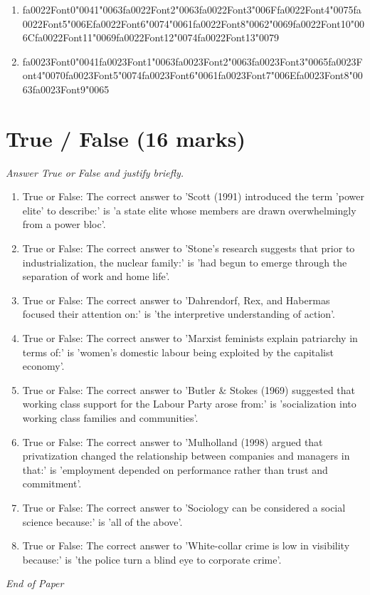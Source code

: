 \documentclass[12pt]{article}
\begin{document}
\begin{enumerate}[label=\arabic*.]
\begin{enumerate}[label=(\alph*)]
    \item {\csname fa0022Font0\endcsname\char"0041}{\char"0063}{\csname fa0022Font2\endcsname\char"0063}{\csname fa0022Font3\endcsname\char"006F}{\csname fa0022Font4\endcsname\char"0075}{\csname fa0022Font5\endcsname\char"006E}{\csname fa0022Font6\endcsname\char"0074}{\char"0061}{\csname fa0022Font8\endcsname\char"0062}{\char"0069}{\csname fa0022Font10\endcsname\char"006C}{\csname fa0022Font11\endcsname\char"0069}{\csname fa0022Font12\endcsname\char"0074}{\csname fa0022Font13\endcsname\char"0079}
    \item {\csname fa0023Font0\endcsname\char"0041}{\csname fa0023Font1\endcsname\char"0063}{\csname fa0023Font2\endcsname\char"0063}{\csname fa0023Font3\endcsname\char"0065}{\csname fa0023Font4\endcsname\char"0070}{\csname fa0023Font5\endcsname\char"0074}{\csname fa0023Font6\endcsname\char"0061}{\csname fa0023Font7\endcsname\char"006E}{\csname fa0023Font8\endcsname\char"0063}{\csname fa0023Font9\endcsname\char"0065}
\end{enumerate}
\end{enumerate}

\section*{True / False (16 marks)}
\textit{Answer True or False and justify briefly.}
\begin{enumerate}[label=\arabic*.]
\item True or False: The correct answer to 'Scott (1991) introduced the term 'power elite' to describe:' is 'a state elite whose members are drawn overwhelmingly from a power bloc'.
\item True or False: The correct answer to 'Stone's research suggests that prior to industrialization, the nuclear family:' is 'had begun to emerge through the separation of work and home life'.
\item True or False: The correct answer to 'Dahrendorf, Rex, and Habermas focused their attention on:' is 'the interpretive understanding of action'.
\item True or False: The correct answer to 'Marxist feminists explain patriarchy in terms of:' is 'women's domestic labour being exploited by the capitalist economy'.
\item True or False: The correct answer to 'Butler \& Stokes (1969) suggested that working class support for the Labour Party arose from:' is 'socialization into working class families and communities'.
\item True or False: The correct answer to 'Mulholland (1998) argued that privatization changed the relationship between companies and managers in that:' is 'employment depended on performance rather than trust and commitment'.
\item True or False: The correct answer to 'Sociology can be considered a social science because:' is 'all of the above'.
\item True or False: The correct answer to 'White-collar crime is low in visibility because:' is 'the police turn a blind eye to corporate crime'.
\end{enumerate}

\vfill
\noindent\textit{End of Paper}
\end{document}
